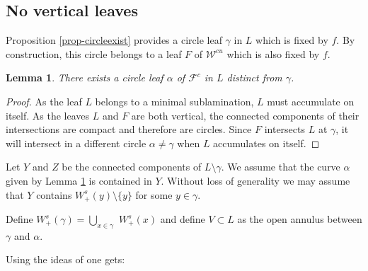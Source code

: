 \documentclass[11pt]{amsart} %
\newcommand{\cW}{\mathcal{W}}
\newcommand{\Ws}{W^s}
\newcommand{\Wsp}{W^s_+}
\newcommand{\cF}{\mathcal{F}}
\newcommand{\subof}{\subset}
\newcommand{\gam}{\gamma}
\numberwithin{equation}{section}
\newtheorem{lemma}[equation]{Lemma}
\theoremstyle{remark}
\begin{document}
\subsection{No vertical leaves}\label{ss.finishproof}
Proposition \ref{prop-circleexist} provides a circle leaf $\gamma$ in $L$ which is fixed by $f$. By construction, this circle belongs to a leaf $F$ of $\cW^{cu}$ which is also fixed by $f$. 

\begin{lemma}\label{lem.othercircle}
There exists a circle leaf $\alpha$ of $\cF^c$ in $L$ distinct from $\gamma$. 
\end{lemma}

\begin{proof} As the leaf $L$ belongs to a minimal sublamination, $L$ must accumulate on itself. As the leaves $L$ and $F$ are both vertical, the connected components of their intersections are compact and therefore are circles. Since $F$ intersects $L$ at $\gamma$, it will intersect in a different circle $\alpha \neq \gamma$ when $L$ accumulates on itself. 
\end{proof}

Let $Y$ and $Z$ be the connected components of $L \setminus \gamma$. We assume that the curve $\alpha$ given by Lemma \ref{lem.othercircle} is contained in $Y$. Without loss of generality we may assume that $Y$ contains $\Ws_+(y)\setminus \{y\}$ for some $y \in \gamma$. 




Define $\Wsp(\gamma) = \bigcup_{x  \in  \gam}$ $\Wsp(x)$
and define $V \subof L$ as the open annulus between $\gamma$ and $\alpha$.

Using the ideas of \cite[Section 2.1]{BonattiWilkinson} one gets:
\end{document}
